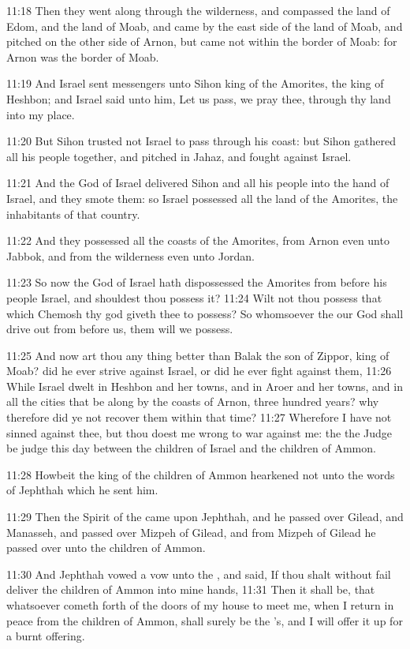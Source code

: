 11:18 Then they went along through the wilderness, and compassed the land of Edom, and the land of Moab, and came by the east side of the land of Moab, and pitched on the other side of Arnon, but came not within the border of Moab: for Arnon was the border of Moab.

11:19 And Israel sent messengers unto Sihon king of the Amorites, the king of Heshbon; and Israel said unto him, Let us pass, we pray thee, through thy land into my place.

11:20 But Sihon trusted not Israel to pass through his coast: but Sihon gathered all his people together, and pitched in Jahaz, and fought against Israel.

11:21 And the \LORD God of Israel delivered Sihon and all his people into the hand of Israel, and they smote them: so Israel possessed all the land of the Amorites, the inhabitants of that country.

11:22 And they possessed all the coasts of the Amorites, from Arnon even unto Jabbok, and from the wilderness even unto Jordan.

11:23 So now the \LORD God of Israel hath dispossessed the Amorites from before his people Israel, and shouldest thou possess it?  11:24 Wilt not thou possess that which Chemosh thy god giveth thee to possess? So whomsoever the \LORD our God shall drive out from before us, them will we possess.

11:25 And now art thou any thing better than Balak the son of Zippor, king of Moab? did he ever strive against Israel, or did he ever fight against them, 11:26 While Israel dwelt in Heshbon and her towns, and in Aroer and her towns, and in all the cities that be along by the coasts of Arnon, three hundred years? why therefore did ye not recover them within that time?  11:27 Wherefore I have not sinned against thee, but thou doest me wrong to war against me: the \LORD the Judge be judge this day between the children of Israel and the children of Ammon.

11:28 Howbeit the king of the children of Ammon hearkened not unto the words of Jephthah which he sent him.

11:29 Then the Spirit of the \LORD came upon Jephthah, and he passed over Gilead, and Manasseh, and passed over Mizpeh of Gilead, and from Mizpeh of Gilead he passed over unto the children of Ammon.

11:30 And Jephthah vowed a vow unto the \LORD, and said, If thou shalt without fail deliver the children of Ammon into mine hands, 11:31 Then it shall be, that whatsoever cometh forth of the doors of my house to meet me, when I return in peace from the children of Ammon, shall surely be the \LORD's, and I will offer it up for a burnt offering.

